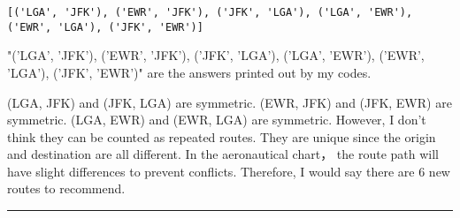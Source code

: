 \documentclass[11pt]{article}
\begin{document}
    \begin{Verbatim}[commandchars=\\\{\}]
[('LGA', 'JFK'), ('EWR', 'JFK'), ('JFK', 'LGA'), ('LGA', 'EWR'), ('EWR', 'LGA'), ('JFK', 'EWR')]

    \end{Verbatim}

    "('LGA', 'JFK'), ('EWR', 'JFK'), ('JFK', 'LGA'), ('LGA', 'EWR'), ('EWR',
'LGA'), ('JFK', 'EWR')" are the answers printed out by my codes.

(LGA, JFK) and (JFK, LGA) are symmetric. (EWR, JFK) and (JFK, EWR) are
symmetric. (LGA, EWR) and (EWR, LGA) are symmetric. However, I don't
think they can be counted as repeated routes. They are unique since the
origin and destination are all different. In the aeronautical chart，
the route path will have slight differences to prevent conflicts.
Therefore, I would say there are 6 new routes to recommend.

    \begin{center}\rule{0.5\linewidth}{\linethickness}\end{center}


    
    
    
    
\end{document}
